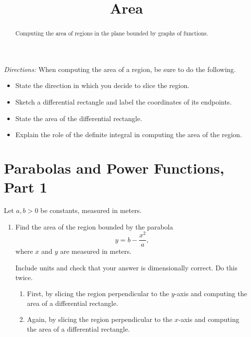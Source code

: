 \documentclass{ximera}
\title{Area}
\begin{document}
\begin{abstract}
Computing the area of regions in the plane bounded by graphs of functions.
\end{abstract}
\maketitle

\emph{Directions:} When computing the area of a region, be sure to do the following.
\begin{itemize}
\item State the direction in which you decide to slice the region.

\item Sketch a differential rectangle and label the coordinates of its endpoints.

\item State the area of the differential rectangle.

\item Explain the role of the definite integral in computing the area of the region. 
\end{itemize}

\section{Parabolas and Power Functions, Part 1}

\begin{question} \label{QWeerFGHG}
Let $a,b>0$ be constants, measured in meters. 

\begin{enumerate}

\item Find the area of the region bounded by the parabola
\[
     y  = b - \frac{x^2}{a} ,
\]
where $x$ and $y$ are measured in meters.

Include units and check that your answer is dimensionally correct. Do this twice.

\begin{enumerate}
\item First, by slicing the region perpendicular to the $y$-axis and computing the area of a differential rectangle.

\item Again, by slicing the region perpendicular to the $x$-axis and computing the area of a differential rectangle.
\end{enumerate}
\end{enumerate}
\end{question}
\end{document}
